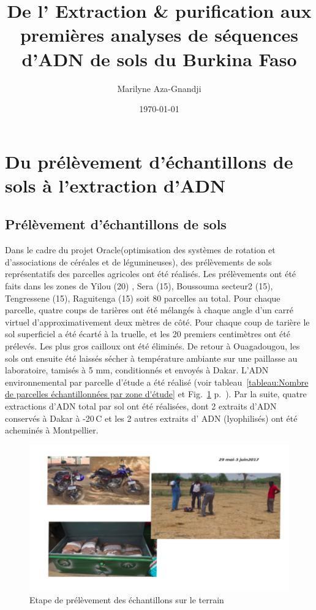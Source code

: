 \documentclass[a4paper,11pt]{article}
\begin{document}
\title{De l' Extraction \& purification aux premières analyses de
  séquences d'ADN de sols du Burkina Faso} \author{Marilyne
  Aza-Gnandji} \date{\today}

\maketitle \tableofcontents
\newpage

\section{Du prélèvement d'échantillons de sols à l'extraction d'ADN}


\subsection{Prélèvement d'échantillons de sols}

Dans le cadre du projet Oracle(optimisation des systèmes de rotation
et d’associations de céréales et de légumineuses), des prélèvements de
sols représentatifs des parcelles agricoles ont été réalisés. Les
prélèvements ont été faits dans les zones de Yilou (20) , Sera (15),
Boussouma secteur2 (15), Tengressene (15), Raguitenga (15) soit 80
parcelles au total. Pour chaque parcelle, quatre coups de tarières ont
été mélangés à chaque angle d’un carré virtuel d’approximativement
deux mètres de côté. Pour chaque coup de tarière le sol superficiel a
été écarté à la truelle, et les 20 premiers centimètres ont été
prélevés. Les plus \og{}gros cailloux\fg{} ont été éliminés.  De
retour à Ouagadougou, les sols ont ensuite été laissés sécher à
température ambiante sur une paillasse au laboratoire, tamisés à 5 mm,
conditionnés et envoyés à Dakar. L'ADN environnemental par parcelle
d’étude a été réalisé (voir tableau~\ref{tableau:Nombre de parcelles
  échantillonnées par zone d'étude} et Fig.~\ref{fig-image1}
p.~\pageref{fig-image1}).  Par la suite, quatre extractions d'ADN
total par sol ont été réalisées, dont 2 extraits d’ADN conservés à
Dakar à -20\,\degree{}C et les 2 autres extraits d' ADN (lyophilisés)
ont été acheminés à Montpellier.


\begin{figure}
  \begin{center}
    \includegraphics[width=16cm]{images/image1}
  \end{center}
  \caption{Etape de prélèvement des échantillons sur le terrain}
  \label{fig-image1}
\end{figure}
\end{document}
